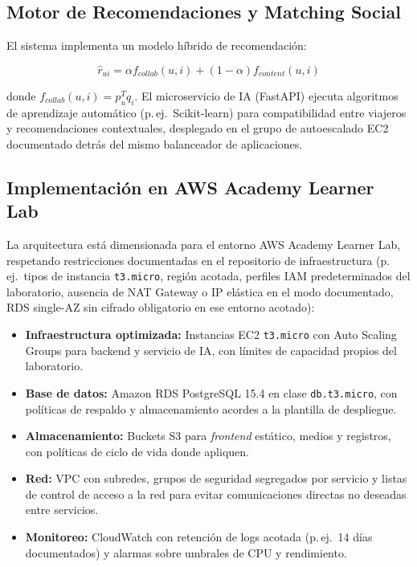 \documentclass[12pt, letterpaper]{article}
\begin{document}
\subsection*{Motor de Recomendaciones y Matching Social}

El sistema implementa un modelo híbrido de recomendación:

\begin{equation}
\hat{r}_{ui} = \alpha f_{collab}(u,i) + (1-\alpha) f_{content}(u,i)
\end{equation}

donde $f_{collab}(u,i) = p_u^T q_i$. El microservicio de IA (FastAPI) ejecuta algoritmos de aprendizaje automático (p.\,ej.\ Scikit-learn) para compatibilidad entre viajeros y recomendaciones contextuales, desplegado en el grupo de autoescalado EC2 documentado detrás del mismo balanceador de aplicaciones.

\subsection*{Implementación en AWS Academy Learner Lab}

La arquitectura está dimensionada para el entorno AWS Academy Learner Lab, respetando restricciones documentadas en el repositorio de infraestructura (p.\,ej.\ tipos de instancia \texttt{t3.micro}, región acotada, perfiles IAM predeterminados del laboratorio, ausencia de NAT Gateway o IP elástica en el modo documentado, RDS single-AZ sin cifrado obligatorio en ese entorno acotado):

\begin{itemize}
\item \textbf{Infraestructura optimizada:} Instancias EC2 \texttt{t3.micro} con Auto Scaling Groups para backend y servicio de IA, con límites de capacidad propios del laboratorio.
\item \textbf{Base de datos:} Amazon RDS PostgreSQL 15.4 en clase \texttt{db.t3.micro}, con políticas de respaldo y almacenamiento acordes a la plantilla de despliegue.
\item \textbf{Almacenamiento:} Buckets S3 para \textit{frontend} estático, medios y registros, con políticas de ciclo de vida donde apliquen.
\item \textbf{Red:} VPC con subredes, grupos de seguridad segregados por servicio y listas de control de acceso a la red para evitar comunicaciones directas no deseadas entre servicios.
\item \textbf{Monitoreo:} CloudWatch con retención de logs acotada (p.\,ej.\ 14 días documentados) y alarmas sobre umbrales de CPU y rendimiento.
\end{itemize}
\end{document}
